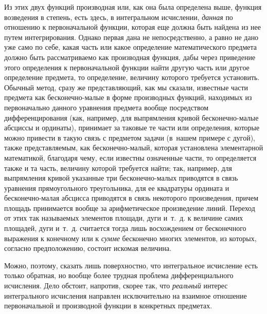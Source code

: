 Из этих двух функций производная или, как она была определена выше, функция
возведения в степень, есть здесь, в интегральном исчислении, {\em данная} по
отношению к первоначальной функции, которая еще должна быть найдена из нее
путем интегрирования. Однако первая дана не непосредственно, а равно не дано
уже само по себе, какая часть или какое определение математического предмета
должно быть рассматриваемо как производная функция, дабы через приведение этого
определения к первоначальной функции найти другую часть или другое определение
предмета, то определение, величину которого требуется установить. Обычный
метод, сразу же представляющий, как мы сказали, известные части предмета как
бесконечно-малые в форме производных функций, находимых из первоначально
данного уравнения предмета вообще посредством дифференцирования (как, например,
для выпрямления кривой бесконечно-малые абсциссы и ординаты), принимает за
таковые те части или определения, которые можно привести в такую связь с
предметом задачи (в~нашем примере с дугой), также представляемым, как
бесконечно-малый, которая установлена элементарной математикой, благодаря чему,
если известны означенные части, то определяется также и та часть, величину
которой требуется найти; так, например, для выпрямления кривой указанные три
бесконечно-малых приводятся в связь уравнения прямоугольного треугольника, для
ее квадратуры ордината и бесконечно-малая абсцисса приводятся в связь
некоторого произведения, причем площадь принимается вообще за арифметическое
произведение линий. Переход от этих так называемых элементов площади, дуги
и~т.~д. к величине самих площадей, дуги и~т.~д. считается тогда лишь
восхождением от бесконечного выражения к конечному или к {\em сумме} бесконечно
многих элементов, из которых, согласно предположению, состоит искомая величина.

Можно, поэтому, сказать лишь поверхностно, что интегральное исчисление есть
только обратная, но вообще более трудная проблема дифференциального исчисления.
Дело обстоит, напротив, скорее так, что {\em реальный} интерес интегрального
исчисления направлен исключительно на взаимное отношение первоначальной и
производной функции в конкретных предметах.


